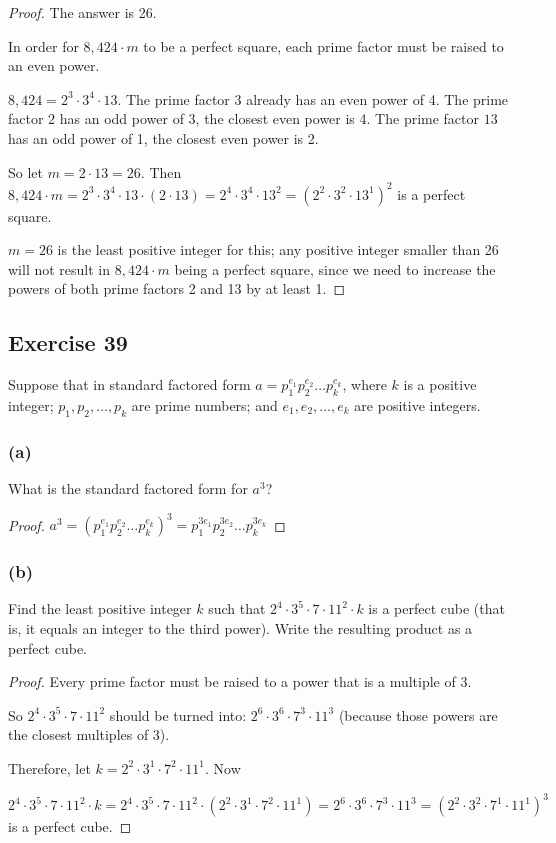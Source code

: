 \documentclass[14pt]{extarticle}
\begin{document}
\begin{proof}
The answer is 26. 

In order for $8,424 \cdot m$ to be a perfect square, each prime factor must be raised to an even power.

$8,424 = 2^3 \cdot 3^4 \cdot 13$. The prime factor $3$ already has an even power of 4. The prime factor $2$ has an odd power of 3, the closest even power is 4. The prime factor $13$ has an odd power of 1, the closest even power is 2. 

So let $m = 2 \cdot 13 = 26$. Then $8,424 \cdot m = 2^3 \cdot 3^4 \cdot 13 \cdot (2 \cdot 13) = 2^4 \cdot 3^4 \cdot 13^2 = (2^2 \cdot 3^2 \cdot 13^1)^2$ is a perfect square. 

$m = 26$ is the least positive integer for this; any positive integer smaller than 26 will not result in $8,424 \cdot m$ being a perfect square, since we need to increase the powers of both prime factors 2 and 13 by at least 1.
\end{proof}

\subsection{Exercise 39}
Suppose that in standard factored form $a = p_1^{e_1} p_2^{e_2} \ldots p_k^{e_k}$, where $k$ is a positive integer; $p_1, p_2, \ldots, p_k$ are prime numbers; and $e_1, e_2, \ldots , e_k$ are positive integers.

\subsubsection{(a)}
What is the standard factored form for $a^3$?

\begin{proof}
$a^3 = (p_1^{e_1} p_2^{e_2} \ldots p_k^{e_k})^3 = p_1^{3e_1} p_2^{3e_2} \ldots p_k^{3e_k}$
\end{proof}

\subsubsection{(b)}
Find the least positive integer $k$ such that $2^4 \cdot 3^5 \cdot 7 \cdot 11^2 \cdot k$ is a perfect cube (that is, it equals an integer to the third power). Write the resulting product as a perfect cube.

\begin{proof}
Every prime factor must be raised to a power that is a multiple of 3.

So $2^4 \cdot 3^5 \cdot 7 \cdot 11^2$ should be turned into: $2^6 \cdot 3^6 \cdot 7^3 \cdot 11^3$ (because those powers are the closest multiples of 3).

Therefore, let $k = 2^2 \cdot 3^1 \cdot 7^2 \cdot 11^1$. Now 

$2^4 \cdot 3^5 \cdot 7 \cdot 11^2 \cdot k = 2^4 \cdot 3^5 \cdot 7 \cdot 11^2 \cdot (2^2 \cdot 3^1 \cdot 7^2 \cdot 11^1) = 2^6 \cdot 3^6 \cdot 7^3 \cdot 11^3 = (2^2 \cdot 3^2 \cdot 7^1 \cdot 11^1)^3$ is a perfect cube.
\end{proof}
\end{document}
